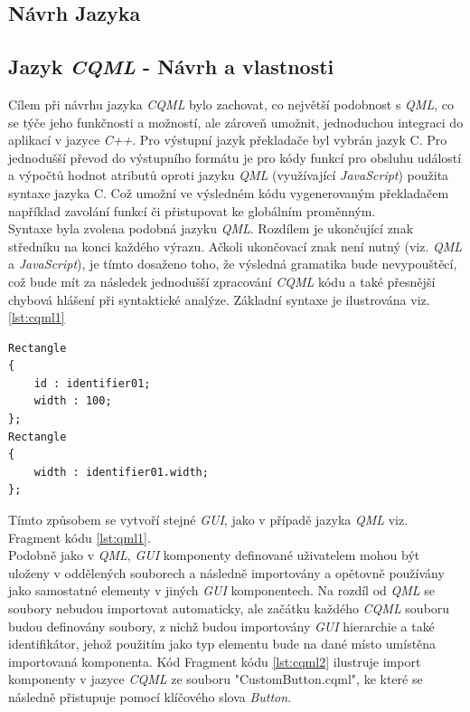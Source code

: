 \documentclass[11pt,twoside,a4paper]{book}
\begin{document}
{{\begin{ttemize}
{{\chapter{\label{CH:CQMLDes}Návrh Jazyka}
\section{\label{SEC:CQML}Jazyk \textit{CQML} - Návrh a vlastnosti}
Cílem při návrhu jazyka \textit{CQML} bylo zachovat, co největší podobnost s \textit{QML}, co se týče jeho funkčnosti a možností, ale zároveň umožnit, jednoduchou integraci do aplikací v jazyce \textit{C++}. Pro výstupní jazyk překladače byl vybrán jazyk C. Pro jednodušší převod do výstupního formátu je pro kódy funkcí pro obsluhu událostí a výpočtů hodnot atributů oproti jazyku \textit{QML} (využívající \textit{JavaScript}) použita syntaxe jazyka C. Což umožní ve výsledném kódu vygenerovaným překladačem například zavolání funkcí či přistupovat ke globálním proměnným.\\
Syntaxe byla zvolena podobná jazyku \textit{QML}. Rozdílem je ukončující znak středníku na konci každého výrazu. Ačkoli ukončovací znak není nutný (viz. \textit{QML} a \textit{JavaScript}), je tímto dosaženo toho, že výsledná gramatika bude nevypouštěcí, což bude mít za následek jednodušší zpracování \textit{CQML} kódu a také přesnější chybová hlášení při syntaktické analýze. Základní syntaxe je ilustrována viz. \ref{lst:cqml1}
\begin{lstlisting}[frame=single,caption=Tvorba dvou jednoduchých elementů pomocí jazyka \textit{CQML}.,label=lst:cqml1]
Rectangle
{
	id : identifier01;
	width : 100;
};
Rectangle
{
	width : identifier01.width;
};
\end{lstlisting}
Tímto způsobem se vytvoří stejné \textit{GUI}, jako v případě jazyka \textit{QML} viz. Fragment kódu \ref{lst:qml1}.\\
Podobně jako v \textit{QML}, \textit{GUI} komponenty definované uživatelem mohou být uloženy v oddělených souborech a následně importovány a opětovně používány jako samostatné elementy v jiných \textit{GUI} komponentech. Na rozdíl od \textit{QML} se soubory nebudou importovat automaticky, ale začátku každého \textit{CQML} souboru budou definovány soubory, z nichž budou importovány \textit{GUI} hierarchie a také identifikátor, jehož použitím jako typ elementu bude na dané místo umístěna importovaná komponenta. Kód Fragment kódu \ref{lst:cqml2} ilustruje import komponenty v jazyce \textit{CQML} ze souboru "CustomButton.cqml", ke které se následně přistupuje pomocí klíčového slova \textit{Button}.
}}
\end{ttemize}}}
\end{document}
